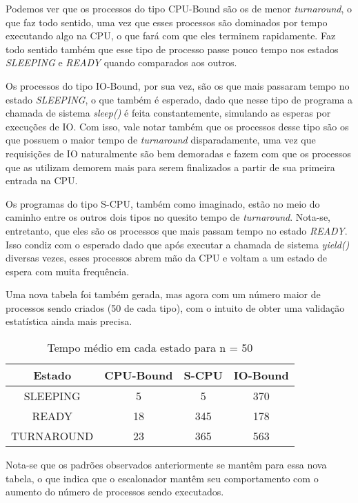 \documentclass{article}
\begin{document}
Podemos ver que os processos do tipo CPU-Bound são os de menor
\textit{turnaround}, o que faz todo sentido, uma vez que esses processos são
dominados por tempo executando algo na CPU, o que fará com que eles terminem
rapidamente. Faz todo sentido também que esse tipo de processo passe pouco
tempo
nos estados \textit{SLEEPING} e \textit{READY} quando comparados aos outros.

Os processos do tipo IO-Bound, por sua vez, são os que mais passaram tempo no
estado \textit{SLEEPING}, o que também é esperado, dado que nesse tipo de
programa a chamada de sistema \textit{sleep()} é feita constantemente,
simulando as esperas por execuções de IO. Com isso, vale notar também que os
processos desse tipo são os que possuem o maior tempo de \textit{turnaround}
disparadamente, uma vez que requisições de IO naturalmente são bem demoradas e
fazem com que os processos que as utilizam demorem mais para serem finalizados
a partir de sua primeira entrada na CPU.

Os programas do tipo S-CPU, também como imaginado, estão no meio do caminho
entre os outros dois tipos no quesito tempo de \textit{turnaround}. Nota-se,
entretanto, que eles são os processos que mais passam tempo no estado
\textit{READY}. Isso condiz com o esperado dado que após executar a chamada de
sistema \textit{yield()} diversas vezes, esses processos abrem mão da CPU e
voltam a um estado de espera com muita frequência.

Uma nova tabela foi também gerada, mas agora com um número maior de processos
sendo criados (50 de cada tipo), com o intuito de obter uma validação estatística
ainda mais precisa.

\begin{table}[H]
      \centering
      \begin{tabular}{|c|c|c|c|}
            \hline
            Estado     & CPU-Bound & S-CPU &
            IO-Bound                             \\
            \hline
            SLEEPING   & 5         & 5     & 370 \\
            READY      & 18        & 345   & 178 \\
            TURNAROUND & 23        & 365   & 563 \\
            \hline
      \end{tabular}
      \caption{Tempo médio em cada estado para n = 50}
\end{table}

Nota-se que os padrões observados anteriormente se mantêm para essa nova
tabela, o que indica que o escalonador mantêm seu comportamento com o aumento
do número de processos sendo executados.
\end{document}
